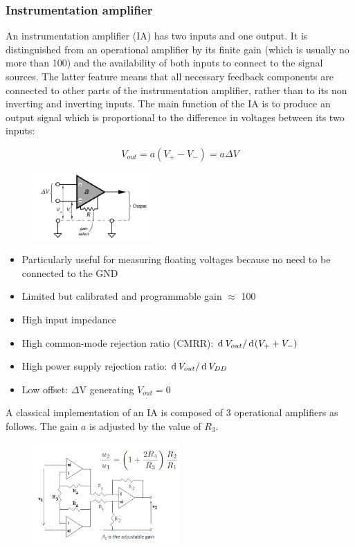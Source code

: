 \subsubsection{Instrumentation amplifier}

An instrumentation amplifier (IA) has two inputs and one output. It is
distinguished from an operational amplifier by its finite gain (which is usually no
more than 100) and the availability of both inputs to connect to the signal
sources. The latter feature means that all necessary feedback components are
connected to other parts of the instrumentation amplifier, rather than to its non inverting
and inverting inputs. The main function of the IA is to produce an output
signal which is proportional to the difference in voltages between its two inputs:

$$V_{out} = a(V_+ - V_-) = a \Delta V$$

\begin{figure}[H]
    \centering
    \includegraphics[width = 0.4\textwidth]{L4/img/instr-amp1.PNG}
\end{figure}


\begin{itemize}
    \item Particularly useful for measuring floating voltages because no need to be connected to the GND
   \item Limited but calibrated
    and programmable gain $\approx$ 100
    \item High input impedance
    \item High common-mode
    rejection ratio (CMRR):
    $\operatorname{d}\!\: V_{out}/\operatorname{d}\!\: (V_++V_-)$
    \item High power supply rejection
    ratio: $\operatorname{d}\!\: V_{out}/\operatorname{d}\!\: V_{DD}$
    \item Low offset:
    $\Delta$V generating $V_{out}=0$
\end{itemize}
A classical implementation of an IA is composed of 3 operational amplifiers as follows. The gain $a$ is adjusted by the value of $R_3$.

\begin{figure}[H]
    \centering
    \includegraphics[width = 0.5\textwidth]{L4/img/instr-amp2.PNG}
\end{figure}

